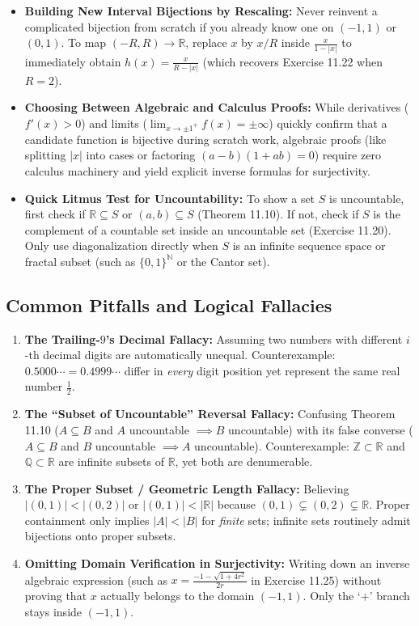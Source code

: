 \documentclass[11pt, letterpaper]{article}
\theoremstyle{definition}
\theoremstyle{remark}
\begin{document}
\begin{itemize}
    \item \textbf{Building New Interval Bijections by Rescaling:} Never reinvent a complicated bijection from scratch if you already know one on $(-1, 1)$ or $(0, 1)$. To map $(-R, R) \to \mathbb{R}$, replace $x$ by $x/R$ inside $\frac{x}{1 - |x|}$ to immediately obtain $h(x) = \frac{x}{R - |x|}$ (which recovers Exercise 11.22 when $R = 2$).
    \item \textbf{Choosing Between Algebraic and Calculus Proofs:} While derivatives ($f'(x) > 0$) and limits ($\lim_{x \to \pm 1^{\mp}} f(x) = \pm \infty$) quickly confirm that a candidate function is bijective during scratch work, algebraic proofs (like splitting $|x|$ into cases or factoring $(a - b)(1 + ab) = 0$) require zero calculus machinery and yield explicit inverse formulas for surjectivity.
    \item \textbf{Quick Litmus Test for Uncountability:} To show a set $S$ is uncountable, first check if $\mathbb{R} \subseteq S$ or $(a, b) \subseteq S$ (Theorem 11.10). If not, check if $S$ is the complement of a countable set inside an uncountable set (Exercise 11.20). Only use diagonalization directly when $S$ is an infinite sequence space or fractal subset (such as $\{0, 1\}^{\mathbb{N}}$ or the Cantor set).
\end{itemize}

\subsection{Common Pitfalls and Logical Fallacies}

\begin{enumerate}[label=\textbf{\arabic*.}]
    \item \textbf{The Trailing-$9$'s Decimal Fallacy:} Assuming two numbers with different $i$-th decimal digits are automatically unequal. Counterexample: $0.5000\cdots = 0.4999\cdots$ differ in \emph{every} digit position yet represent the same real number $\frac{1}{2}$.
    \item \textbf{The ``Subset of Uncountable'' Reversal Fallacy:} Confusing Theorem 11.10 ($A \subseteq B$ and $A$ uncountable $\implies B$ uncountable) with its false converse ($A \subseteq B$ and $B$ uncountable $\implies A$ uncountable). Counterexample: $\mathbb{Z} \subset \mathbb{R}$ and $\mathbb{Q} \subset \mathbb{R}$ are infinite subsets of $\mathbb{R}$, yet both are denumerable.
    \item \textbf{The Proper Subset / Geometric Length Fallacy:} Believing $|(0, 1)| < |(0, 2)|$ or $|(0, 1)| < |\mathbb{R}|$ because $(0, 1) \subsetneq (0, 2) \subsetneq \mathbb{R}$. Proper containment only implies $|A| < |B|$ for \emph{finite} sets; infinite sets routinely admit bijections onto proper subsets.
    \item \textbf{Omitting Domain Verification in Surjectivity:} Writing down an inverse algebraic expression (such as $x = \frac{-1 - \sqrt{1 + 4r^2}}{2r}$ in Exercise 11.25) without proving that $x$ actually belongs to the domain $(-1, 1)$. Only the `$+$' branch stays inside $(-1, 1)$.
\end{enumerate}
\end{document}
